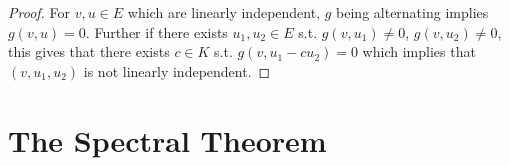 \documentclass{article}
\begin{document}
\begin{proof}
    For $v, u \in E$ which are linearly independent, $g$ being alternating implies $g(v, u) = 0$. Further if there exists $u_1, u_2 \in E$ s.t. $g(v, u_1)\neq 0$, $g(v, u_2) \neq 0$, this gives that there exists $c \in K$ s.t. $g(v, u_1 - c u_2) = 0$ which implies that $(v, u_1, u_2)$ is not linearly independent.
\end{proof}

\section{The Spectral Theorem}
\end{document}
